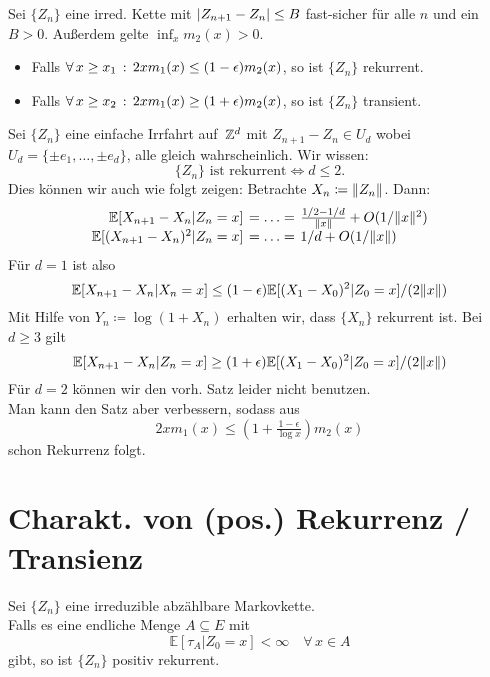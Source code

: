 \documentclass{cheat-sheet}
\newcommand{\E}{\mathbb{E}} %
\begin{document}
\begin{satz}
  Sei $\{ Z_n \}$ eine irred. Kette mit
  $\lvert Z_{n+1} - Z_n\rvert \leq B$ fast-sicher für alle $n$ und ein $B > 0$.
  Außerdem gelte ${\inf}_{x} m_2(x) > 0$.
  \begin{itemize}
    \item Falls $\forall \, {x \geq x_1} \,:\, 2 x m_1(x) \leq (1-\epsilon) m_2(x)$, so ist $\{ Z_n \}$ rekurrent.
    \item Falls $\forall \, {x \geq x_2} \,:\, 2 x m_1(x) \geq (1 + \epsilon) m_2(x)$, so ist $\{ Z_n \}$ transient.
  \end{itemize}
\end{satz}

\begin{bsp}
  Sei $\{ Z_n \}$ eine einfache Irrfahrt auf~$\mathbb{Z}^d$ mit
  $Z_{n+1} - Z_n \in U_d$ wobei $U_d = \{ \pm e_1, \ldots, \pm e_d \}$, alle gleich wahrscheinlich.
  Wir wissen:
  \[
    \{ Z_n \} \text{ ist rekurrent} \iff d \leq 2.
  \]
  Dies können wir auch wie folgt zeigen:
  Betrachte $X_n \coloneqq \lVert Z_n\rVert$.
  Dann:
  \[
    \arraycolsep=2pt
    \begin{array}{r l l}
      \E[ X_{n+1} - X_n | Z_n = x ] & = \ldots = & \tfrac{1/2 - 1/d}{\norm{x}} + O(1 / \norm{x}^2) \\
      \E[ (X_{n+1} - X_n)^2 | Z_n = x ] & = \ldots = & 1/d + O(1 / \norm{x})
    \end{array}
  \]
  Für $d = 1$ ist also
  \[ \E[ X_{n+1} - X_n | X_n = x ] \leq (1-\epsilon) \E[ (X_1 - X_0)^2 | Z_0 = x ] / (2 \norm{x}) \]
  Mit Hilfe von $Y_n \coloneqq \log(1 + X_n)$ erhalten wir, dass $\{ X_n \}$ rekurrent ist.
  Bei $d \geq 3$ gilt
  \[ \E[ X_{n+1} - X_n | Z_n = x ] \geq (1+\epsilon) \E[ (X_1 - X_0)^2 | Z_0 = x ] / (2 \norm{x}) \]
  Für $d = 2$ können wir den vorh. Satz leider nicht benutzen. \\
  Man kann den Satz aber verbessern, sodass aus
  \[ 2 x m_1(x) \leq (1 + \tfrac{1-\epsilon}{\log x}) m_2(x) \]
  schon Rekurrenz folgt.
\end{bsp}

\section{Charakt. von (pos.) Rekurrenz / Transienz}


\begin{lem}
  Sei $\{ Z_n \}$ eine irreduzible abzählbare Markovkette. \\
  Falls es eine endliche Menge $A \subseteq E$ mit
  \[
    \E[ \tau_A | Z_0 = x ] < \infty
    \quad \forall\, x \in A
  \]
  gibt, so ist $\{ Z_n \}$ positiv rekurrent.
\end{lem}
\end{document}
